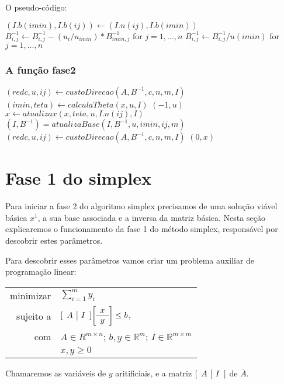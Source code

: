 \documentclass[12pt]{article}
\begin{document}
O pseudo-código:
\begin{algorithmic}
\State $(I.b(imin), I.b(ij)) \gets (I.n(ij), I.b(imin))$
		\State $B^{-1}_{i, j} \gets B^{-1}_{i, j} - (u_i / u_{imin}) * B^{-1}_{imin, j}$ for $j = 1, ..., n$
	\EndIf
\EndFor
\State $B^{-1}_{i, j} \gets B^{-1}_{i, j} / u(imin)$ for $j = 1, ..., n$
\EndFunction
\end{algorithmic}


\subsubsection{A função fase2}
\begin{algorithmic}
	\State $(redc, u, ij) \gets custoDirecao (A, B^{-1}, c, n, m, I)$
    		\State $(imin, teta) \gets calculaTheta(x, u, I)$
    		    			\Return $(-1, u)$
    		\EndIf
    		\State $x \gets atualizax(x, teta, u, I.n(ij), I)$
    		\State $(I, B^{-1}) = atualizaBase(I, B^{-1}, u, imin, ij, m)$
    		\State $(redc, u, ij) \gets custoDirecao (A, B^{-1}, c, n, m, I)$
    \EndWhile
    \Return $(0, x)$
\EndFunction
\end{algorithmic}

\newpage
\section{Fase 1 do simplex}
	Para iniciar a fase 2 do algoritmo simplex precisamos de uma solução viável básica $x^1$, a sua base associada e a inversa da matriz básica. Nesta seção explicaremos o funcionamento da fase 1 do método simplex, responsável por descobrir estes parâmetros.

Para descobrir esses parâmetros vamos criar um problema auxiliar de programação linear:

\begin{center}
	\begin{tabular}{r l}
		minimizar & $\sum_{i = 1}^{m} y_i$ \\
		sujeito a & $
					[\begin{array}{c | c}
						A & I
					\end{array}]
					
					\bigg[\begin{array}{c}
						x \\
						\hline
						y
					\end{array}\bigg]
					
					\leq b$, \\
			com   &	$A \in R^{m \times n}$; $b, y \in \mathbb{R}^m$; $I \in \mathbb{R}^{m \times m}$ \\
            & $x, y \geq 0$
	\end{tabular}
\end{center}
Chamaremos as variáveis de $y$ aritificiais, e a matriz $[\begin{array}{c | c} A & I	\end{array}]$ de $\overline{A}$.
\end{document}
